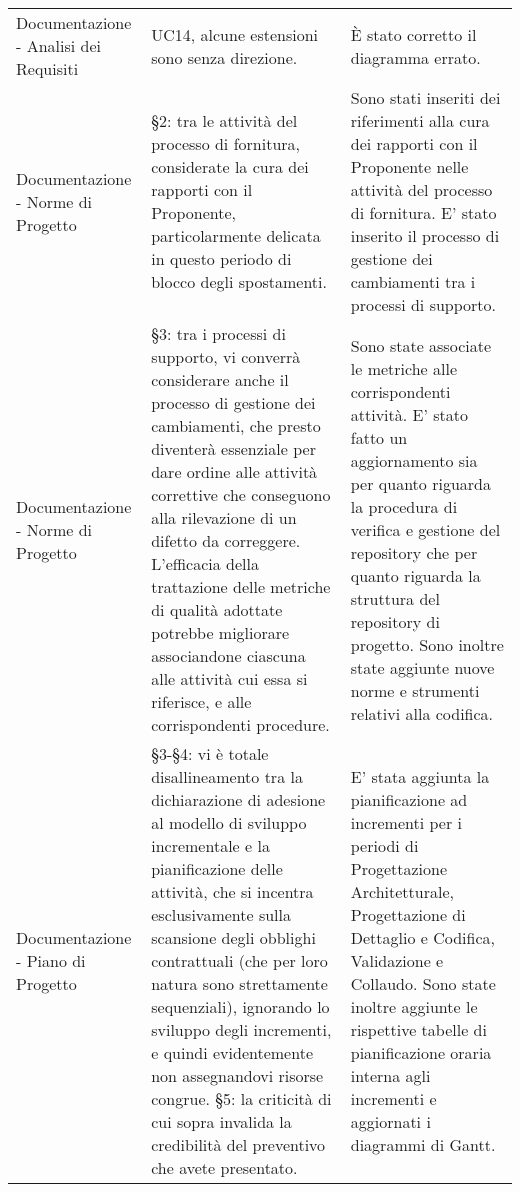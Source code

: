 \begin{longtable}{ 
				>{\centering}p{} 
				>{\centering}p{}
				>{\centering\arraybackslash}p{}}
				Documentazione - Analisi dei Requisiti
					&
				UC14, alcune estensioni sono senza direzione.
					&
				È stato corretto il diagramma errato. 
					\\
			
		 
				Documentazione - Norme di Progetto
					&
				 §2: tra le attività del processo di fornitura, considerate la cura dei rapporti con il Proponente\ped{\textit{G}}, particolarmente delicata in questo periodo di blocco degli spostamenti.
					&
				Sono stati inseriti dei riferimenti alla cura dei rapporti con il Proponente\ped{\textit{G}} nelle attività del processo di fornitura. E' stato inserito il processo di gestione dei cambiamenti tra i processi di supporto.
					\\
			
				Documentazione - Norme di Progetto
					&
				 §3: tra i processi di supporto, vi converrà considerare anche il processo di gestione dei cambiamenti, che presto diventerà essenziale per dare ordine alle attività correttive che conseguono alla rilevazione di un difetto da correggere. L'efficacia della trattazione delle metriche di qualità adottate potrebbe migliorare associandone ciascuna alle attività cui essa si riferisce, e alle corrispondenti procedure.
					&
				Sono state associate le metriche alle corrispondenti attività.
				E' stato fatto un aggiornamento sia per quanto riguarda la procedura di verifica e gestione del repository\ped{\textit{G}} che per quanto riguarda la struttura del repository\ped{\textit{G}} di progetto. Sono inoltre state aggiunte nuove norme e strumenti relativi alla codifica.
					\\
			 
				Documentazione - Piano di Progetto
					&
				§3-§4: vi è totale disallineamento tra la dichiarazione di adesione al modello di sviluppo incrementale e la pianificazione delle attività, che si incentra esclusivamente sulla scansione degli obblighi contrattuali (che per loro natura sono strettamente sequenziali), ignorando lo sviluppo degli incrementi, e quindi evidentemente non assegnandovi risorse congrue. §5: la criticità di cui sopra invalida la credibilità del preventivo che avete presentato.
					&
				E' stata aggiunta la pianificazione ad incrementi per i periodi di Progettazione Architetturale, Progettazione di Dettaglio e Codifica, Validazione e Collaudo. Sono state inoltre aggiunte le rispettive tabelle di pianificazione oraria interna agli incrementi e aggiornati i diagrammi di Gantt.
					\\
			

\end{longtable}
